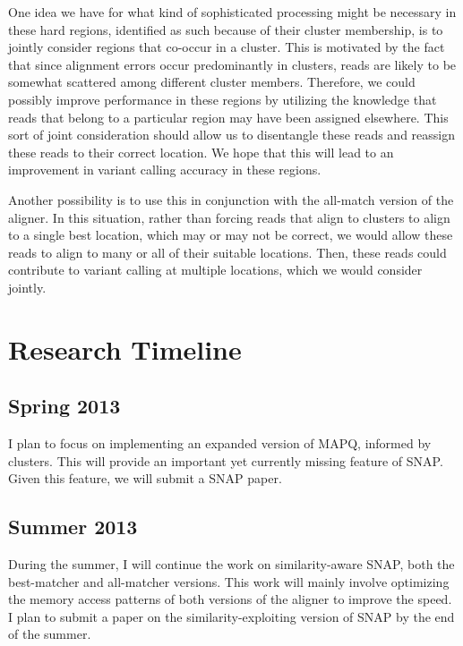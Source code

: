 \documentclass[twocolumn,10pt]{article}
\begin{document}
One idea we have for what kind of sophisticated processing might be necessary in these hard regions, identified as such because of their cluster membership, is to jointly consider regions that co-occur in a cluster.  This is motivated by the fact that since alignment errors occur predominantly in clusters, reads are likely to be somewhat scattered among different cluster members.  Therefore, we could possibly improve performance in these regions by utilizing the knowledge that reads that belong to a particular region may have been assigned elsewhere.  This sort of joint consideration should allow us to disentangle these reads and reassign these reads to their correct location.  We hope that this will lead to an improvement in variant calling accuracy in these regions.

Another possibility is to use this in conjunction with the all-match version of the aligner.  In this situation, rather than forcing reads that align to clusters to align to a single best location, which may or may not be correct, we would allow these reads to align to many or all of their suitable locations.  Then, these reads could contribute to variant calling at multiple locations, which we would consider jointly.

\section{Research Timeline}

\subsection*{Spring 2013}
I plan to focus on implementing an expanded version of MAPQ, informed by clusters.  This will provide an important yet currently missing feature of SNAP.  Given this feature, we will submit a SNAP paper.

\subsection*{Summer 2013}
During the summer, I will continue the work on similarity-aware SNAP, both the best-matcher and all-matcher versions.  This work will mainly involve optimizing the memory access patterns of both versions of the aligner to improve the speed.  I plan to submit a paper on the similarity-exploiting version of SNAP by the end of the summer.
\end{document}
